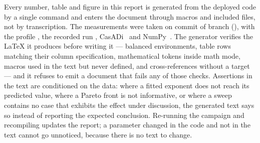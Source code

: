 \documentclass[11pt,a4paper]{article}
\begin{document}
Every number, table and figure in this report is generated from the deployed code by a single command and
enters the document through macros and included files, not by transcription. The measurements were taken on
commit \texttt{\resCommit} of branch \texttt{\resBranch} (\resDate), with the profile \resProfile{}, the
recorded run \resBag, CasADi~\resCasadi{} and NumPy~\resNumpy. The generator verifies the LaTeX it produces
before writing it --- balanced environments, table rows matching their column specification, mathematical
tokens inside math mode, macros used in the text but never defined, and cross-references without a target ---
and it refuses to emit a document that fails any of those checks. Assertions in the text are conditioned on
the data: where a fitted exponent does not reach its predicted value, where a Pareto front is not
informative, or where a sweep contains no case that exhibits the effect under discussion, the generated text
says so instead of reporting the expected conclusion. Re-running the campaign and recompiling updates the
report; a parameter changed in the code and not in the text cannot go unnoticed, because there is no text to
change.


\end{document}

